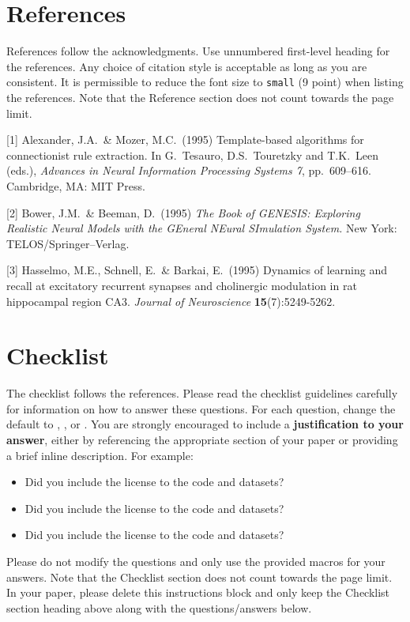 \documentclass{article}
\begin{document}
\section*{References}
\citep{choromanski2020performer}
References follow the acknowledgments. Use unnumbered first-level heading for
the references. Any choice of citation style is acceptable as long as you are
consistent. It is permissible to reduce the font size to \verb+small+ (9 point)
when listing the references.
Note that the Reference section does not count towards the page limit.
\medskip




{
\small

[1] Alexander, J.A.\ \& Mozer, M.C.\ (1995) Template-based algorithms for
connectionist rule extraction. In G.\ Tesauro, D.S.\ Touretzky and T.K.\ Leen
(eds.), {\it Advances in Neural Information Processing Systems 7},
pp.\ 609--616. Cambridge, MA: MIT Press.

[2] Bower, J.M.\ \& Beeman, D.\ (1995) {\it The Book of GENESIS: Exploring
  Realistic Neural Models with the GEneral NEural SImulation System.}  New York:
TELOS/Springer--Verlag.

[3] Hasselmo, M.E., Schnell, E.\ \& Barkai, E.\ (1995) Dynamics of learning and
recall at excitatory recurrent synapses and cholinergic modulation in rat
hippocampal region CA3. {\it Journal of Neuroscience} {\bf 15}(7):5249-5262.
}

\section*{Checklist}

The checklist follows the references.  Please
read the checklist guidelines carefully for information on how to answer these
questions.  For each question, change the default \answerTODO{} to \answerYes{},
\answerNo{}, or \answerNA{}.  You are strongly encouraged to include a {\bf
justification to your answer}, either by referencing the appropriate section of
your paper or providing a brief inline description.  For example:
\begin{itemize}
  \item Did you include the license to the code and datasets? 
  \item Did you include the license to the code and datasets? 
  \item Did you include the license to the code and datasets? \answerNA{}
\end{itemize}
Please do not modify the questions and only use the provided macros for your
answers.  Note that the Checklist section does not count towards the page
limit.  In your paper, please delete this instructions block and only keep the
Checklist section heading above along with the questions/answers below.
\end{document}

